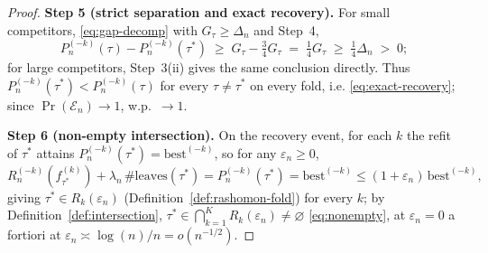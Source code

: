\begin{proof}
\smallskip\noindent\textbf{Step 5 (strict separation and exact recovery).}
For small competitors, \eqref{eq:gap-decomp} with $G_\tau\ge\Delta_n$ and Step~4,
\begin{equation}\label{eq:strict}
  P_n^{(-k)}(\tau) - P_n^{(-k)}(\tau^\ast)
  \;\ge\; G_\tau - \tfrac34 G_\tau
  \;=\; \tfrac14 G_\tau \;\ge\; \tfrac14\Delta_n \;>\; 0;
\end{equation}
for large competitors, Step~3(ii) gives the same conclusion directly. Thus
$P_n^{(-k)}(\tau^\ast)<P_n^{(-k)}(\tau)$ for every $\tau\neq\tau^\ast$ on every
fold, i.e. \eqref{eq:exact-recovery}; since $\Pr(\mathcal{E}_n)\to1$, w.p.\ $\to1$.

\smallskip\noindent\textbf{Step 6 (non-empty intersection).}
On the recovery event, for each $k$ the refit of $\tau^\ast$ attains
$P_n^{(-k)}(\tau^\ast)=\text{best}^{(-k)}$, so for any $\varepsilon_n\ge0$,
\begin{equation}\label{eq:in-Rk}
  R_n^{(-k)}(f_{\tau^\ast}^{(k)}) + \lambda_n\,\#\mathrm{leaves}(\tau^\ast)
  = P_n^{(-k)}(\tau^\ast) = \text{best}^{(-k)}
  \le (1+\varepsilon_n)\,\text{best}^{(-k)},
\end{equation}
giving $\tau^\ast\in R_k(\varepsilon_n)$ (Definition~\ref{def:rashomon-fold}) for
every $k$; by Definition~\ref{def:intersection},
$\tau^\ast\in\bigcap_{k=1}^K R_k(\varepsilon_n)\neq\varnothing$
\eqref{eq:nonempty}, at $\varepsilon_n=0$ a fortiori at
$\varepsilon_n\asymp\log(n)/n=o(n^{-1/2})$.
\end{proof}

